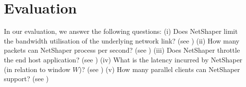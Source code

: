 \section{Evaluation}
\label{sec:netshaper-evaluation}

In our evaluation, we answer the following questions:
(i) Does NetShaper limit the bandwidth utilisation of the underlying network link? (see )
(ii) How many packets can NetShaper process per second? (see )
(iii) Does NetShaper throttle the end host application? (see )
(iv) What is the latency incurred by NetShaper (in relation to window $W$)? (see )
(v) How many parallel clients can NetShaper support? (see )






